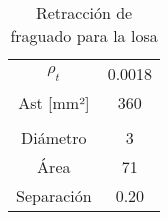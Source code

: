 \begin{table}[H]
  \centering
    \begin{tabular}{|c|c|}
    \hline
    \rowcolor[rgb]{ .2,  .247,  .31} \multicolumn{2}{|c|}{\textcolor[rgb]{ 1,  1,  1}{Retracción de fraguado}} \bigstrut\\
    \hline
    \rowcolor[rgb]{ .2,  .247,  .31} \textcolor[rgb]{ 1,  1,  1}{$\rho_{t}$} & \cellcolor[rgb]{ 1,  1,  1}0.0018 \bigstrut\\
    \hline
    \rowcolor[rgb]{ .2,  .247,  .31} \textcolor[rgb]{ 1,  1,  1}{Ast [mm²]} & \cellcolor[rgb]{ 1,  1,  1}360 \bigstrut\\
\cline{2-2}    \multicolumn{1}{r}{} & \multicolumn{1}{r}{} \bigstrut\\
    \hline
    \rowcolor[rgb]{ .2,  .247,  .31} \textcolor[rgb]{ 1,  1,  1}{Diámetro} & \cellcolor[rgb]{ 1,  1,  1}3 \bigstrut\\
    \hline
    \rowcolor[rgb]{ .2,  .247,  .31} \textcolor[rgb]{ 1,  1,  1}{Área} & \cellcolor[rgb]{ 1,  1,  1}71 \bigstrut\\
    \hline
    \rowcolor[rgb]{ .2,  .247,  .31} \textcolor[rgb]{ 1,  1,  1}{Separación} & \cellcolor[rgb]{ 1,  1,  1}0.20 \bigstrut\\
\cline{2-2}    \end{tabular}%
  \caption{Retracción de fraguado para la losa}
  \label{tab:R fraguado}%
\end{table}%
